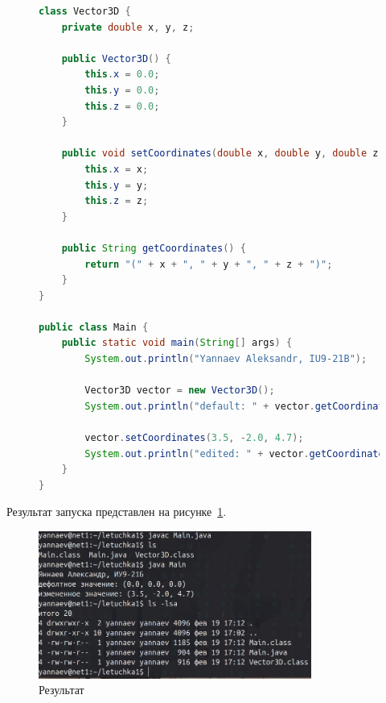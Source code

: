 \documentclass[a4paper, 14pt]{extarticle}
\begin{document}
\begin{figure}[!htb]
\begin{lstlisting}[language={java},caption={Файл Main.java},label={lst:code1}]
class Vector3D {
    private double x, y, z;

    public Vector3D() {
        this.x = 0.0;
        this.y = 0.0;
        this.z = 0.0;
    }

    public void setCoordinates(double x, double y, double z) {
        this.x = x;
        this.y = y;
        this.z = z;
    }

    public String getCoordinates() {
        return "(" + x + ", " + y + ", " + z + ")";
    }
}

public class Main {
    public static void main(String[] args) {
        System.out.println("Yannaev Aleksandr, IU9-21B");

        Vector3D vector = new Vector3D();
        System.out.println("default: " + vector.getCoordinates());

        vector.setCoordinates(3.5, -2.0, 4.7);
        System.out.println("edited: " + vector.getCoordinates());
    }
}

\end{lstlisting}
\end{figure}



Результат запуска представлен на рисунке~\ref{fig:img1}.

\begin{figure}[!htb]
	\centering
	\includegraphics[width=0.8\textwidth]{img1}
\caption{Результат}
\label{fig:img1}
\end{figure}
\end{document}
